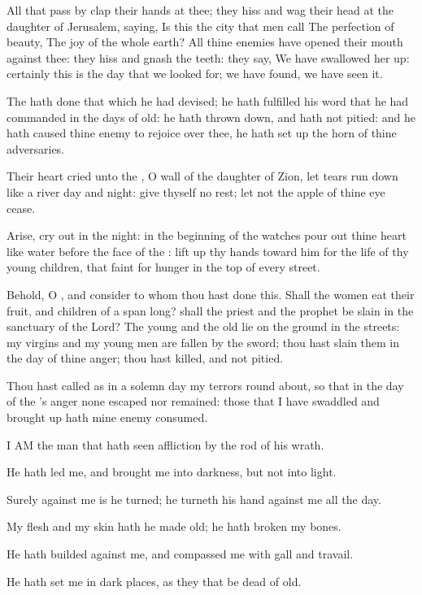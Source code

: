 \Verse All that pass by clap their hands at thee; they hiss and wag their head at the daughter of Jerusalem, saying, Is this the city that men call The perfection of beauty, The joy of the whole earth?  \Verse All thine enemies have opened their mouth against thee: they hiss and gnash the teeth: they say, We have swallowed her up: certainly this is the day that we looked for; we have found, we have seen it.

\Verse The \LORD hath done that which he had devised; he hath fulfilled his word that he had commanded in the days of old: he hath thrown down, and hath not pitied: and he hath caused thine enemy to rejoice over thee, he hath set up the horn of thine adversaries.

\Verse Their heart cried unto the \LORD, O wall of the daughter of Zion, let tears run down like a river day and night: give thyself no rest; let not the apple of thine eye cease.

\Verse Arise, cry out in the night: in the beginning of the watches pour out thine heart like water before the face of the \LORD: lift up thy hands toward him for the life of thy young children, that faint for hunger in the top of every street.

\Verse Behold, O \LORD, and consider to whom thou hast done this. Shall the women eat their fruit, and children of a span long? shall the priest and the prophet be slain in the sanctuary of the Lord?  \Verse The young and the old lie on the ground in the streets: my virgins and my young men are fallen by the sword; thou hast slain them in the day of thine anger; thou hast killed, and not pitied.

\Verse Thou hast called as in a solemn day my terrors round about, so that in the day of the \LORD's anger none escaped nor remained: those that I have swaddled and brought up hath mine enemy consumed.


\Chapter
\Verse I AM the man that hath seen affliction by the rod of his wrath.

\Verse He hath led me, and brought me into darkness, but not into light.

\Verse Surely against me is he turned; he turneth his hand against me all the day.

\Verse My flesh and my skin hath he made old; he hath broken my bones.

\Verse He hath builded against me, and compassed me with gall and travail.

\Verse He hath set me in dark places, as they that be dead of old.

